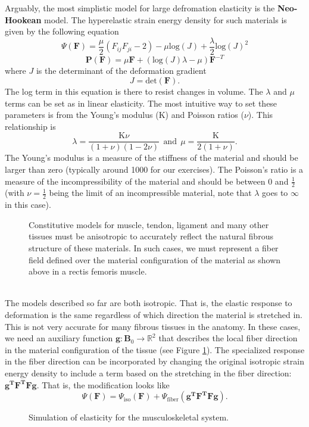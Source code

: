 Arguably, the most simplistic model for large defromation elasticity is the {\bf Neo-Hookean} model. The hyperelastic strain energy density for such materials is given by the following equation
$$
\Psi(\mathbf{F})=\frac{\mu}{2}\left(F_{ij}F_{ji}-2\right)-\mu\textrm{log}(J)+\frac{\lambda}{2}\textrm{log}(J)^2
$$
$$
\mathbf{P}(\mathbf{F})=\mu\mathbf{F}+(\textrm{log}(J)\lambda-\mu)\mathbf{F}^{-T}
$$
where  $J$ is the determinant of the deformation gradient
$$
J=\textrm{det}(\mathbf{F}).
$$
The log term in this equation is there to resist changes in volume. The $\lambda$ and $\mu$ terms can be set as in linear elasticity. The most intuitive way to set these parameters is from the Young's modulus ($\textrm{K}$) and Poisson ratios ($\nu$). This relationship is
$$
\lambda=\frac{\textrm{K}\nu}{(1+\nu)(1-2\nu)} \ \ \textrm{and} \ \ \mu=\frac{\textrm{K}}{2(1+\nu)}.
$$
The Young's modulus is a measure of the stiffness of the material and should be larger than zero (typically around 1000 for our exercises). The Poisson's ratio is a measure of the incompressibility of the material and should be between 0 and $\frac{1}{2}$ (with $\nu=\frac{1}{2}$ being the limit of an incompressible material, note that $\lambda$ goes to $\infty$ in this case).\\
\begin{figure}
\caption{Constitutive models for muscle, tendon, ligament and many other tissues must be anisotropic to accurately reflect the natural fibrous structure of these materials. In such cases, we must represent a fiber field defined over the material configuration of the material as shown above in a rectis femoris muscle.}
\label{fibers}
\end{figure}
\\
The models described so far are both isotropic. That is, the elastic response to deformation is the same regardless of which direction the material is stretched in. This is not very accurate for many fibrous tissues in the anatomy. In these cases, we need an auxiliary function $\mathbf{g}:\mathbf{B}_0\rightarrow\mathbb{R}^2$ that describes the local fiber direction in the material configuration of the tissue (see Figure \ref{fibers}). The specialized response in the fiber direction can be incorporated by changing the original isotropic strain energy density to include a term based on the stretching in the fiber direction: $\mathbf{g^TF^TFg}$. That is, the modification looks like
$$
\Psi(\mathbf{F})=\Psi_\textrm{iso}(\mathbf{F})+\Psi_\textrm{fiber}(\mathbf{g^TF^TFg}).
$$
\begin{figure}
\caption{Simulation of elasticity for the musculoskeletal system.}
\end{figure}
